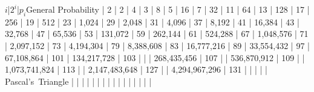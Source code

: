 

\eltt
$i$|$2^i$|$p_i$\vtt General \vtt Probability  | 2 | 2 \vtt {} \vtt {} | 4 | 3 \vtt  \vtt {} | 8 | 5 \vtt \vtt {} | 16 | 7 \vtt \vtt {} | 32 | 11 \vtt  \vtt {} | 64 | 13 \vtt  \vtt {} | 128 | 17 \vtt  \vtt {} | 256 | 19 \vtt  \vtt {} | 512 | 23 \vtt  \vtt {} | 1,024 | 29 \vtt  \vtt {} | 2,048 | 31 \vtt \vtt {} | 4,096 | 37 \vtt \vtt {} | 8,192 | 41 \vtt  \vtt {} | 16,384 | 43 \vtt \vtt {} | 32,768 | 47 \vtt \vtt {} | 65,536 | 53 \vtt  \vtt {} | 131,072 | 59 \vtt \vtt {} | 262,144 | 61 \vtt  \vtt {} | 524,288 | 67 \vtt  \vtt {} | 1,048,576 | 71 \vtt  \vtt  {} | 2,097,152 | 73 \vtt  \vtt {} | 4,194,304 | 79 \vtt \vtt {} | 8,388,608 | 83 \vtt  \vtt {} | 16,777,216 | 89 \vtt  \vtt {} | 33,554,432 | 97 \vtt  \vtt {} | 67,108,864 | 101 \vtt  \vtt {} | 134,217,728 | 103 \vtt \vtt \elspec | | \vtt \ttrule \vtt {} | 268,435,456 | 107 \vtt  {} |  | 536,870,912 | 109 \vtt  |  | 1,073,741,824 | 113 \vtt |  | 2,147,483,648 | 127 \vtt  |  | 4,294,967,296 | 131 \vtt  | \elspec \ttrule | \ttrule | \ttrule | |  \el
{} \hbox{Pascal's Triangle} \vtt | \elspec \trule | \trule | \trule | |  \el
{}  \vtt | \el
{}  \vtt | \el
{}  \vtt | \el
{}  \vtt | \el
{}  \vtt | \el
{}  \vtt | \el
{}  \vtt | \el
{}  \vtt | \el
{}  \vtt | \el
{}  \vtt | \el
{}  \vtt |
\EndTable

\bye
